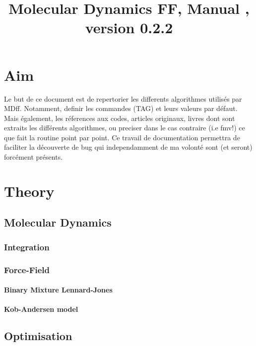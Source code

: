 \documentclass[a4paper]{article}
\title{Molecular Dynamics FF, Manual , version 0.2.2}
\newcommand{\MDFF}{{\sc MDff}}
\newcommand{\FMV}{{\sc fmv}}
\begin{document}
\maketitle
\clearpage
\tableofcontents

\clearpage

\section{Aim}

Le but de ce document est de repertorier les differents 
algorithmes utilis\'es par \MDFF. Notamment, definir les 
commandes (TAG) et leurs valeurs par défaut. Mais également, 
les r\'eferences aux codes, articles originaux, livres dont 
sont extraits les diff\'erents algorithmes, ou preciser dans 
le cas contraire (i.e \FMV!) ce que fait la routine point par point. 
Ce travail de documentation permettra de faciliter la d\'ecouverte
de bug qui independamment de ma volont\'e sont (et seront) 
forc\'ement pr\'esents. 

\clearpage

\section{Theory}

\subsection{Molecular Dynamics\label{sec:MD}}
\subsubsection{Integration\label{sec:integrator}}
\subsubsection{Force-Field}
\paragraph{Binary Mixture Lennard-Jones\label{sec:BMLJ}}
\paragraph{Kob-Andersen model\label{sec:KA}}


\subsection{Optimisation\label{sec:OPT}}
\end{document}
